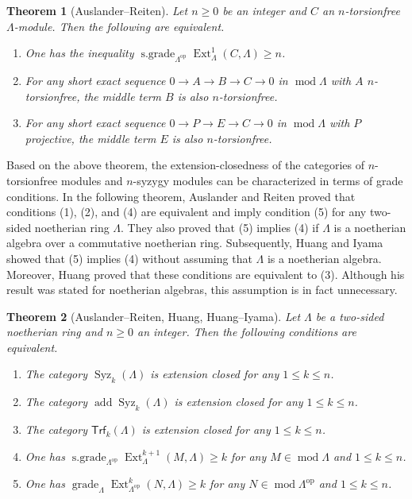 \documentclass{amsart}
\newtheorem{thm}{Theorem}[section]
\theoremstyle{definition}
\theoremstyle{remark}
\numberwithin{equation}{thm}
\def\add{\operatorname{add}}
\def\Ext{\operatorname{Ext}}
\def\ge{\geqslant}
\def\grade{\operatorname{grade}}
\def\le{\leqslant}
\def\mod{\operatorname{mod}}
\def\sgrade{\operatorname{s\text{.}grade}}
\def\Syz{\operatorname{Syz}}
\def\Trf{\mathsf{Trf}}
\begin{document}
\begin{thm}[Auslander--Reiten]\label{ARsgrade}
Let $n\ge0$ be an integer and $C$ an $n$-torsionfree $\Lambda$-module. Then the following are equivalent.
\begin{enumerate}[\rm(1)]
   \item One has the inequality $\sgrade_{\Lambda^{\mathrm{op}}}\Ext^1_\Lambda(C,\Lambda)\ge n$.
   \item For any short exact sequence $0\to A\to B\to C\to 0$ in $\mod\Lambda$ with $A$ $n$-torsionfree, the middle term $B$ is also $n$-torsionfree.
   \item For any short exact sequence $0\to P\to E\to C\to 0$ in $\mod\Lambda$ with $P$ projective, the middle term $E$ is also $n$-torsionfree.
\end{enumerate}
\end{thm}

Based on the above theorem, the extension-closedness of the categories of $n$-torsionfree modules and $n$-syzygy modules can be characterized in terms of grade conditions. In the following theorem, Auslander and Reiten \cite[Theorem 0.1]{AR2} proved that conditions (1), (2), and (4) are equivalent and imply condition (5) for any two-sided noetherian ring $\Lambda$. They also proved that (5) implies (4) if $\Lambda$ is a noetherian algebra over a commutative noetherian ring. Subsequently, Huang and Iyama \cite[Theorem 4.1(3)]{HI} showed that (5) implies (4) without assuming that $\Lambda$ is a noetherian algebra. Moreover, Huang \cite[Theorem 3.3]{Huang99} proved that these conditions are equivalent to (3). Although his result was stated for noetherian algebras, this assumption is in fact unnecessary.

\begin{thm}[Auslander--Reiten, Huang, Huang--Iyama]
Let $\Lambda$ be a two-sided noetherian ring and $n\ge0$ an integer. Then the following conditions are equivalent.
\begin{enumerate}
   \item The category $\Syz_k(\Lambda)$ is extension closed for any $1\le k\le n$.
   \item The category $\add\Syz_k(\Lambda)$ is extension closed for any $1\le k\le n$.
   \item The category $\Trf_k(\Lambda)$ is extension closed for any $1\le k\le n$.
   \item One has $\sgrade_{\Lambda^{\mathrm{op}}}\Ext^{k+1}_\Lambda(M,\Lambda)\ge k$ for any $M\in\mod\Lambda$ and $1\le k\le n$.
   \item One has $\grade_{\Lambda}\Ext^{k}_{\Lambda^{\mathrm{op}}}(N,\Lambda)\ge k$ for any $N\in\mod\Lambda^{\mathrm{op}}$ and $1\le k\le n$.
\end{enumerate}
\end{thm}
\end{document}
